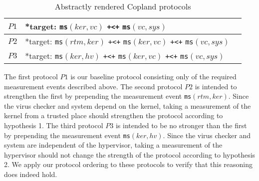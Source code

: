 \documentclass[runningheads]{llncs}
\theoremstyle{definition}
\begin{document}

\begin{table}[h]
  \setlength\extrarowheight{7pt}
  \centering
  \footnotesize
  \begin{tabular}{|M{1cm}|M{8cm}|N}
      \hline  
      $P1$ & *target:  \texttt{ms}$(ker, vc)$ \texttt{+<+} \texttt{ms}$(vc, sys)$ &\\ \hline 
      $P2$ & *target: \texttt{ms}$(rtm, ker)$ \texttt{+<+} \texttt{ms}$(ker, vc)$ \texttt{+<+} \texttt{ms}$(vc, sys)$ &\\
      \hline
      $P3$ & *target: \texttt{ms}$(ker, hv)$ \texttt{+<+} \texttt{ms}$(ker, vc)$ \texttt{+<+} \texttt{ms}$(vc, sys)$ &\\ \hline 
  \end{tabular}
  \caption[Chase Analysis with Varied Dependencies]{Abstractly rendered Copland protocols}
  \label{Chase-table}
\end{table}


The first protocol $P1$ is our baseline protocol consisting only of
the required measurement events described above. The second protocol
$P2$ is intended to strengthen the first by prepending the measurement
event \texttt{ms}$(rtm,ker)$. Since the virus checker and system
depend on the kernel, taking a measurement of the kernel from a
trusted place should strengthen the protocol according to hypothesis
1. The third protocol $P3$ is intended to be no stronger than the
first by prepending the measurement event \texttt{ms}$(ker,hv)$. Since
the virus checker and system are independent of the hypervisor, taking
a measurement of the hypervisor should not change the strength of the
protocol according to hypothesis 2. We apply our protocol ordering to
these protocols to verify that this reasoning does indeed hold. 
\end{document}
